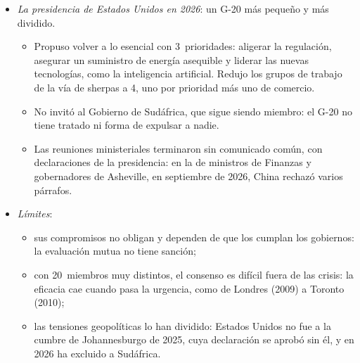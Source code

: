 \documentclass[11pt]{article}
\begin{document}
\begin{itemize}
\begin{itemize}
  \item La reforma financiera: Basilea III, la resolución de los bancos sistémicos y los derivados extrabursátiles .
  \item La fiscalidad internacional: con la OCDE, el proyecto contra la erosión de bases y el traslado de beneficios y el acuerdo de 2~pilares (\ref{sec:ocde}).
  \item La deuda de los países pobres: con la pandemia, la Iniciativa de Suspensión del Servicio de la Deuda aplazó más de 12.000~millones de dólares de pagos de casi 50~países entre mayo de 2020 y diciembre de 2021, y en noviembre de 2020 nació el Marco Común para reestructurarla, con el Club de París\nocite{G202020DSSI,G202020MarcoComun,G20Roma2021,BancoMundial2022DSSI} .
  \end{itemize}
\item \emph{La presidencia de Estados Unidos en 2026}: un G-20 más pequeño y más dividido.
  \begin{itemize}
  \item Propuso volver a lo esencial con 3~prioridades: aligerar la regulación, asegurar un suministro de energía asequible y liderar las nuevas tecnologías, como la inteligencia artificial. Redujo los grupos de trabajo de la vía de sherpas a 4, uno por prioridad más uno de comercio\nocite{Rubio2025NuevoG20}.
  \item No invitó al Gobierno de Sudáfrica, que sigue siendo miembro: el G-20 no tiene tratado ni forma de expulsar a nadie\nocite{Rubio2025NuevoG20}.
  \item Las reuniones ministeriales terminaron sin comunicado común, con declaraciones de la presidencia: en la de ministros de Finanzas y gobernadores de Asheville, en septiembre de 2026, China rechazó varios párrafos\nocite{Tesoro2026Asheville}.
  \end{itemize}
\item \emph{Límites}:
  \begin{itemize}
  \item sus compromisos no obligan y dependen de que los cumplan los gobiernos: la evaluación mutua no tiene sanción;
  \item con 20~miembros muy distintos, el consenso es difícil fuera de las crisis: la eficacia cae cuando pasa la urgencia, como de Londres (2009) a Toronto (2010)\nocite{G202010Toronto};
  \item las tensiones geopolíticas lo han dividido: Estados Unidos no fue a la cumbre de Johannesburgo de 2025, cuya declaración se aprobó sin él, y en 2026 ha excluido a Sudáfrica\nocite{G20Johannesburgo2025}.
  \end{itemize}
\end{itemize}
\end{document}
